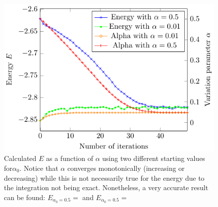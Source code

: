 \begin{figure}
  \begin{center}
  \includegraphics[scale=1 ]{graphs/he-e-alpha-iterations.pdf}
  \caption{Calculated $E$ as a function of $\alpha$ using two different starting values for$\alpha_0$. Notice that $\alpha$ converges monotonically (increasing or decreasing) while this is not necessarily true for the energy due to the integration not being exact. Nonetheless, a very accurate result can be found: $E_{\alpha_0 = 0.5} =  $ and $E_{\alpha_0 = 0.5} =  $}
  \label{fig:He_it}
  \end{center}
\end{figure}
 
